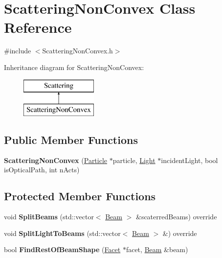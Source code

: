 \hypertarget{class_scattering_non_convex}{}\section{Scattering\+Non\+Convex Class Reference}
\label{class_scattering_non_convex}


{\ttfamily \#include $<$Scattering\+Non\+Convex.\+h$>$}

Inheritance diagram for Scattering\+Non\+Convex\+:\begin{figure}[H]
\begin{center}
\leavevmode
\includegraphics[height=2.000000cm]{class_scattering_non_convex}
\end{center}
\end{figure}
\subsection*{Public Member Functions}
\begin{DoxyCompactItemize}
\item 
\mbox{\label{class_scattering_non_convex_a5f3c70da9700ae22364603289182bb1c}} 
{\bfseries Scattering\+Non\+Convex} (\mbox{\hyperlink{class_particle}{Particle}} $\ast$particle, \mbox{\hyperlink{class_light}{Light}} $\ast$incident\+Light, bool is\+Optical\+Path, int n\+Acts)
\end{DoxyCompactItemize}
\subsection*{Protected Member Functions}
\begin{DoxyCompactItemize}
\item 
\mbox{\label{class_scattering_non_convex_a7190966638776aecf57152da1cc2c566}} 
void {\bfseries Split\+Beams} (std\+::vector$<$ \mbox{\hyperlink{class_beam}{Beam}} $>$ \&scaterred\+Beams) override
\item 
\mbox{\label{class_scattering_non_convex_a4af996add762e6e0a79f2dfdaf22c6f8}} 
void {\bfseries Split\+Light\+To\+Beams} (std\+::vector$<$ \mbox{\hyperlink{class_beam}{Beam}} $>$ \&) override
\item 
\mbox{\label{class_scattering_non_convex_a1c771582d9be525919a4ca4abe3a150d}} 
bool {\bfseries Find\+Rest\+Of\+Beam\+Shape} (\mbox{\hyperlink{class_facet}{Facet}} $\ast$facet, \mbox{\hyperlink{class_beam}{Beam}} \&beam)
\end{DoxyCompactItemize}
